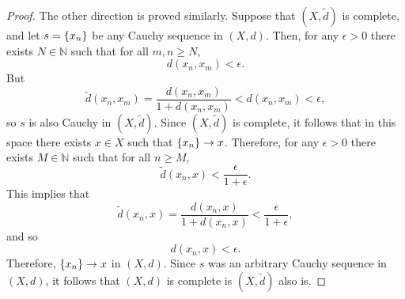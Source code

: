 \documentclass{article}
\newcommand{\N}{\mathbb{N}}
\begin{document}
\begin{proof}
The other direction is proved similarly. Suppose that $(X, \tilde{d})$
is complete, and let $s = \cbr{x_n}$ be any Cauchy sequence in $(X, d)$.
Then, for any $\epsilon > 0$ there exists $N \in \N$ such that for all
$m, n \geq N$,
%
\begin{equation*}
    d(x_n, x_m) < \epsilon
    .
\end{equation*}
%
But
%
\begin{equation*}
    \tilde{d}(x_n, x_m)
        = \frac{d(x_n, x_m)}{1 + d(x_n, x_m)} < d(x_n, x_m) < \epsilon
    ,
\end{equation*}
%
so $s$ is also Cauchy in $(X, \tilde{d})$. Since $(X, \tilde{d})$ is
complete, it follows that in this space there exists $x \in X$ such that
$\cbr{x_n} \to x$. Therefore, for any $\epsilon > 0$ there exists $M \in \N$
such that for all $n \geq M$,
%
\begin{equation*}
    \tilde{d}(x_n, x) < \frac{\epsilon}{1 + \epsilon}
    .
\end{equation*}
%
This implies that
%
\begin{equation*}
    \tilde{d}(x_n, x)
        = \frac{d(x_n, x)}{1 + d(x_n, x)}
        < \frac{\epsilon}{1 + \epsilon}
        ,
\end{equation*}
%
and so
%
\begin{equation*}
    d(x_n, x) < \epsilon
    .
\end{equation*}
%
Therefore, $\cbr{x_n} \to x$ in $(X, d)$. Since $s$ was an arbitrary
Cauchy sequence in $(X, d)$, it follows that $(X, d)$ is complete is
$(X, \tilde{d})$ also is.

\end{proof}
\end{document}
